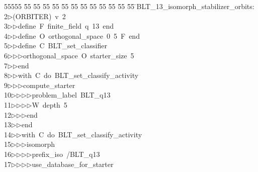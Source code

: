%
%
\begin{tabbing}
55555 \= 55 \= 55 \= 55 \= 55 \= 55 \= 55 \= 55 \= 55 \= 55 \= 55 \= 55 \= 55 \= \>BLT\_13\_isomorph\_stabilizer\_orbits:\\[0pt]
2\>$\triangleright$\>(ORBITER)\ v\ 2\ \\[0pt]
3\>$\triangleright$\>$\triangleright$\>define\ F\ finite\_field\ q\ 13\ end\ \\[0pt]
4\>$\triangleright$\>$\triangleright$\>define\ O\ orthogonal\_space\ 0\ 5\ F\ end\ \\[0pt]
5\>$\triangleright$\>$\triangleright$\>define\ C\ BLT\_set\_classifier\ \\[0pt]
6\>$\triangleright$\>$\triangleright$\>$\triangleright$\>orthogonal\_space\ O\ starter\_size\ 5\ \\[0pt]
7\>$\triangleright$\>$\triangleright$\>end\ \\[0pt]
8\>$\triangleright$\>$\triangleright$\>with\ C\ do\ BLT\_set\_classify\_activity\ \\[0pt]
9\>$\triangleright$\>$\triangleright$\>$\triangleright$\>compute\_starter\ \\[0pt]
10\>$\triangleright$\>$\triangleright$\>$\triangleright$\>$\triangleright$\>problem\_label\ BLT\_q13\ \\[0pt]
11\>$\triangleright$\>$\triangleright$\>$\triangleright$\>$\triangleright$\>W\ depth\ 5\ \\[0pt]
12\>$\triangleright$\>$\triangleright$\>$\triangleright$\>end\ \\[0pt]
13\>$\triangleright$\>$\triangleright$\>end\ \\[0pt]
14\>$\triangleright$\>$\triangleright$\>with\ C\ do\ BLT\_set\_classify\_activity\ \\[0pt]
15\>$\triangleright$\>$\triangleright$\>$\triangleright$\>isomorph\ \\[0pt]
16\>$\triangleright$\>$\triangleright$\>$\triangleright$\>$\triangleright$\>prefix\_iso\ /BLT\_q13\ \\[0pt]
17\>$\triangleright$\>$\triangleright$\>$\triangleright$\>$\triangleright$\>use\_database\_for\_starter\ \\[0pt]

\end{tabbing}
